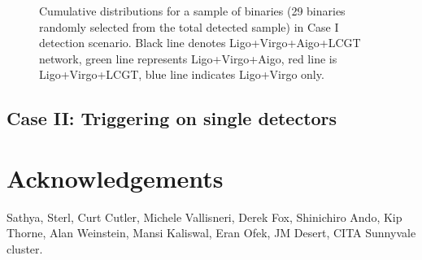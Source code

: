 \documentclass{emulateapj}
\begin{document}
\begin{figure}[h!]
\centering 
{}
\caption{Cumulative distributions for a sample of
  binaries (29 binaries randomly selected from the total detected
  sample) in Case I detection scenario. Black line denotes
  Ligo+Virgo+Aigo+LCGT network, green line represents Ligo+Virgo+Aigo,
  red line is Ligo+Virgo+LCGT, blue line indicates Ligo+Virgo only.  }
\label{fig:cd}
\end{figure} 



\subsection{Case II: Triggering on single detectors}








\section{Acknowledgements}
Sathya, Sterl, Curt Cutler, Michele Vallisneri, Derek Fox, Shinichiro
Ando, Kip Thorne, Alan Weinstein, Mansi Kaliswal, Eran Ofek, JM Desert,
CITA Sunnyvale cluster.




\end{document}
